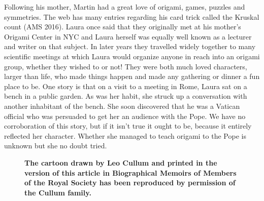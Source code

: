 \documentclass[11pt]{article}
\newcommand{\bc}{\begin{center}}
\newcommand{\ec}{\end{center}}
\begin{document}
\par\smallskip%
Following his mother, Martin had a great love of origami, games, puzzles and symmetries. The web has many entries regarding his card trick called the Kruskal count (AMS 2016). Laura once said that they originally met at his mother's Origami Center in NYC and Laura herself was equally well known as a lecturer and writer on that subject. In later years they travelled widely together to many scientific meetings at which Laura would organize anyone in reach into an origami group, whether they wished to or not! They were both much loved characters, larger than life, who made things happen and made any gathering or dinner a fun place to be. One story is that on a visit to a meeting in Rome, Laura sat on a bench in a public garden. As was her habit, she struck up a conversation with another inhabitant of the bench. She soon discovered that he was a Vatican official who was persuaded to get her an audience with the Pope. We have no corroboration of this story, but if it isn't true it ought to be, because it entirely reflected her character. Whether she managed to teach origami to the Pope is unknown but she no doubt tried.
\begin{figure}%
\bc
\ec
\caption{\scriptsize \textbf{\color{blue}The cartoon drawn by Leo Cullum and printed in the version of this article in 
Biographical Memoirs of Members of the Royal Society has been reproduced by permission of the Cullum family.}}
\end{figure}%
\par\smallskip%
\end{document}
